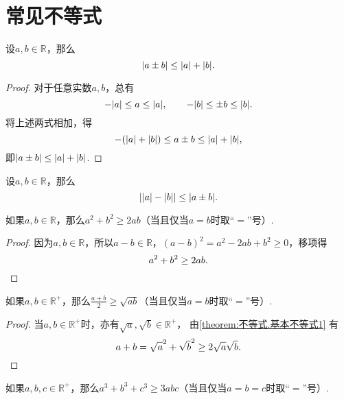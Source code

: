 \section{常见不等式}
\begin{theorem}[三角不等式I]\label{theorem:不等式.三角不等式1}
设\(a,b\in\mathbb{R}\)，那么\begin{equation}
	\abs{a \pm b}
	\leq
	\abs{a} + \abs{b}.
\end{equation}
\begin{proof}
对于任意实数\(a,b\)，总有\[
	-\abs{a} \leq a \leq \abs{a}, \qquad
	-\abs{b} \leq \pm b \leq \abs{b}.
\]
将上述两式相加，得\[
	-(\abs{a}+\abs{b}) \leq a \pm b \leq \abs{a}+\abs{b},
\]即\(\abs{a \pm b} \leq \abs{a}+\abs{b}\).
\end{proof}
\end{theorem}

\begin{theorem}[三角不等式II]\label{theorem:不等式.三角不等式2}
设\(a,b\in\mathbb{R}\)，那么\begin{equation}
	\abs{\abs{a}-\abs{b}}
	\leq
	\abs{a \pm b}.
\end{equation}
\end{theorem}

\begin{theorem}\label{theorem:不等式.基本不等式1}
如果\(a,b\in\mathbb{R}\)，那么\(a^2 + b^2 \geq 2ab\)（当且仅当\(a=b\)时取“\(=\)”号）.
\begin{proof}
因为\(a,b\in\mathbb{R}\)，所以\(a-b\in\mathbb{R}\)，\((a-b)^2 = a^2 - 2ab + b^2 \geq 0\)，移项得\[
a^2 + b^2 \geq 2ab.
\qedhere
\]
\end{proof}
\end{theorem}

\begin{corollary}\label{corollary:不等式.基本不等式2}
如果\(a,b\in\mathbb{R}^+\)，那么\(\frac{a+b}{2} \geq \sqrt{ab}\)（当且仅当\(a=b\)时取“\(=\)”号）.
\begin{proof}
当\(a,b\in\mathbb{R}^+\)时，亦有\(\sqrt{a},\sqrt{b}\in\mathbb{R}^+\)，%
由\cref{theorem:不等式.基本不等式1} 有\[
a + b = \sqrt{a}^2 + \sqrt{b}^2 \geq 2\sqrt{a}\sqrt{b}.
\qedhere
\]
\end{proof}
\end{corollary}

\begin{theorem}\label{theorem:不等式.基本不等式3}
如果\(a,b,c\in\mathbb{R}^+\)，那么\(a^3 + b^3 + c^3 \geq 3abc\)（当且仅当\(a=b=c\)时取“\(=\)”号）.
\end{theorem}

